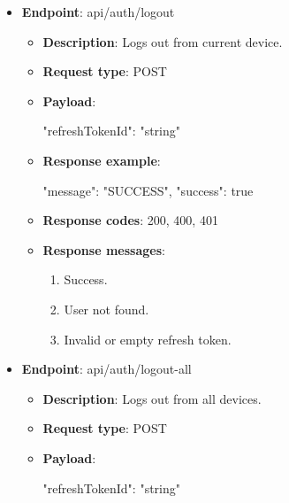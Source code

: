 \begin{itemize}
    \item \textbf{Endpoint}: api/auth/logout

    \begin{itemize}

        \item \textbf{Description}: Logs out from current device.

        \item \textbf{Request type}: POST

        \item \textbf{Payload}:

        \begin{spverbatim}
        {
            "refreshTokenId": "string"
        }
        \end{spverbatim}

        \item \textbf{Response example}:

        \begin{spverbatim}
        {
            "message": "SUCCESS",
            "success": true
        }
        \end{spverbatim}

        \item \textbf{Response codes}: 200, 400, 401

        \item \textbf{Response messages}:
        \begin{enumerate}
            \item Success.
            \item User not found.
            \item Invalid or empty refresh token.
        \end{enumerate}
    \end{itemize}

    \item \textbf{Endpoint}: api/auth/logout-all

    \begin{itemize}

        \item \textbf{Description}: Logs out from all devices.

        \item \textbf{Request type}: POST

        \item \textbf{Payload}:

        \begin{spverbatim}
        {
            "refreshTokenId": "string"
        }
        \end{spverbatim}


\end{itemize}
\end{itemize}
